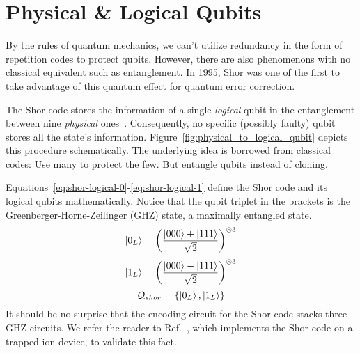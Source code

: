 \section{Physical \& Logical Qubits}

By the rules of quantum mechanics, we can't utilize redundancy in the form of repetition codes to protect qubits. However, there are also phenomenons with no classical equivalent such as entanglement. In 1995, Shor was one of the first to take advantage of this quantum effect for quantum error correction.


\noindent
The Shor code stores the information of a single \textit{logical} qubit in the entanglement between nine \textit{physical} ones~\cite{shor_scheme_1995}. Consequently, no specific (possibly faulty) qubit stores all the state's information. Figure~\ref{fig:physical_to_logical_qubit} depicts this procedure schematically. The underlying idea is borrowed from classical codes: Use many to protect the few. But entangle qubits instead of cloning.

Equations~\ref{eq:shor-logical-0}-\ref{eq:shor-logical-1} define the Shor code and its logical qubits mathematically. Notice that the qubit triplet in the brackets is the Greenberger-Horne-Zeilinger (GHZ) state, a maximally entangled state. 
\begin{equation}\label{eq:shor-logical-0}
    \ket{0_L} = \left(\frac{\ket{000}+\ket{111}}{\sqrt{2}}\right)^{\otimes{}3}
\end{equation}
\begin{equation}\label{eq:shor-logical-1}
    \ket{1_L} = \left(\frac{\ket{000}-\ket{111}}{\sqrt{2}}\right)^{\otimes{}3}
\end{equation}
\begin{equation}\label{eq:the-shor-code}
    \mathcal{Q}_{shor} = \{\ket{0_L}, \ket{1_L}\}
\end{equation}
It should be no surprise that the encoding circuit for the Shor code stacks three GHZ circuits. We refer the reader to Ref.~\cite{nguyen_demonstration_2021}, which implements the Shor code on a trapped-ion device, to validate this fact.
